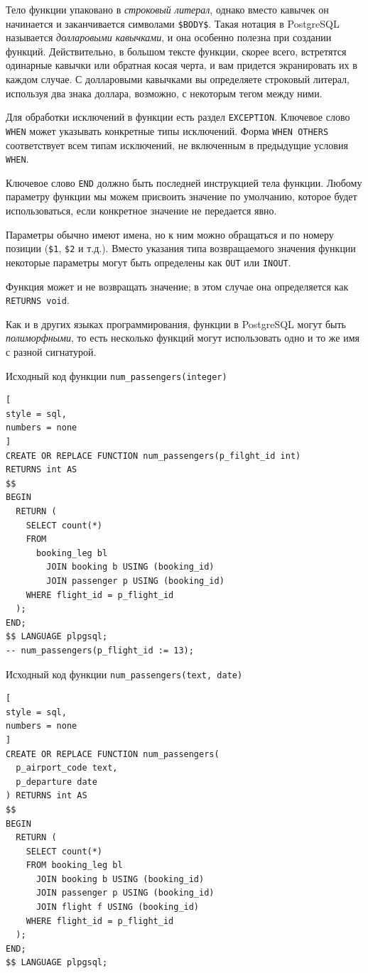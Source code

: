 \documentclass[%
	11pt,
	a4paper,
	utf8,
		]{article}
\begin{document}
Тело функции упаковано в \emph{строковый литерал}, однако вместо кавычек он начинается и заканчивается символами \verb|$BODY$|. Такая нотация в PostgreSQL называется \emph{долларовыми кавычками}, и она особенно полезна при создании функций. Действительно, в большом тексте функции, скорее всего, встретятся одинарные кавычки или обратная косая черта, и вам придется экранировать их в каждом случае. С долларовыми кавычками вы определяете строковый литерал, используя два знака доллара, возможно, с некоторым тегом между ними.

Для обработки исключений в функции есть раздел \verb|EXCEPTION|. Ключевое слово \verb|WHEN| может указывать конкретные типы исключений. Форма \verb|WHEN OTHERS| соответствует всем типам исключений, не включенным в предыдущие условия \verb|WHEN|.

Ключевое слово \verb|END| должно быть последней инструкцией тела функции. Любому параметру функции мы можем присвоить значение по умолчанию, которое будет использоваться, если конкретное значение не передается явно.

Параметры обычно имеют имена, но к ним можно обращаться и по номеру позиции (\verb|$1|, \verb|$2| и т.д.). Вместо указания типа возвращаемого значения функции некоторые параметры могут быть определены как \verb|OUT| или \verb|INOUT|.

Функция может и не возвращать значение; в этом случае она определяется как \verb|RETURNS void|. 

Как и в других языках программирования, функции в PostgreSQL могут быть \emph{полиморфными}, то есть несколько функций могут использовать одно и то же имя с разной сигнатурой.

Исходный код функции \verb|num_passengers(integer)|
\begin{lstlisting}[
style = sql,
numbers = none	
]
CREATE OR REPLACE FUNCTION num_passengers(p_filght_id int)
RETURNS int AS 
$$
BEGIN
  RETURN (
    SELECT count(*)
    FROM
      booking_leg bl
        JOIN booking b USING (booking_id)
        JOIN passenger p USING (booking_id)
    WHERE flight_id = p_flight_id
  );
END;
$$ LANGUAGE plpgsql;
-- num_passengers(p_flight_id := 13);
\end{lstlisting}

Исходный код функции \verb|num_passengers(text, date)|
\begin{lstlisting}[
style = sql,
numbers = none
]
CREATE OR REPLACE FUNCTION num_passengers(
  p_airport_code text,
  p_departure date
) RETURNS int AS
$$
BEGIN
  RETURN (
    SELECT count(*)
    FROM booking_leg bl
      JOIN booking b USING (booking_id)
      JOIN passenger p USING (booking_id)
      JOIN flight f USING (booking_id)
    WHERE flight_id = p_flight_id
  );
END;
$$ LANGUAGE plpgsql;
\end{lstlisting}
\end{document}
